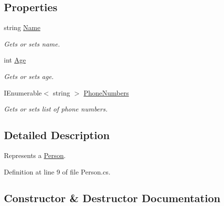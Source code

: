\subsection*{Properties}
\begin{DoxyCompactItemize}
\item 
string \mbox{\hyperlink{class_test_project_1_1_task_library_1_1_tasks_1_1_lesson5_1_1_models_1_1_person_a494f314f579b9a1770e99f3727efa130}{Name}}
\begin{DoxyCompactList}\small\item\em Gets or sets name. \end{DoxyCompactList}\item 
int \mbox{\hyperlink{class_test_project_1_1_task_library_1_1_tasks_1_1_lesson5_1_1_models_1_1_person_a776a3d1f3c7bd5fb37bc7eebfa89ffc2}{Age}}
\begin{DoxyCompactList}\small\item\em Gets or sets age. \end{DoxyCompactList}\item 
I\+Enumerable$<$ string $>$ \mbox{\hyperlink{class_test_project_1_1_task_library_1_1_tasks_1_1_lesson5_1_1_models_1_1_person_a1bf1e43f9d3ef092c30580bf657f3ab6}{Phone\+Numbers}}
\begin{DoxyCompactList}\small\item\em Gets or sets list of phone numbers. \end{DoxyCompactList}\end{DoxyCompactItemize}


\subsection{Detailed Description}
Represents a \mbox{\hyperlink{class_test_project_1_1_task_library_1_1_tasks_1_1_lesson5_1_1_models_1_1_person}{Person}}. 



Definition at line 9 of file Person.\+cs.



\subsection{Constructor \& Destructor Documentation}
\mbox{\label{class_test_project_1_1_task_library_1_1_tasks_1_1_lesson5_1_1_models_1_1_person_a8d5529c0719fe3305202e807e0018fbb}} 
